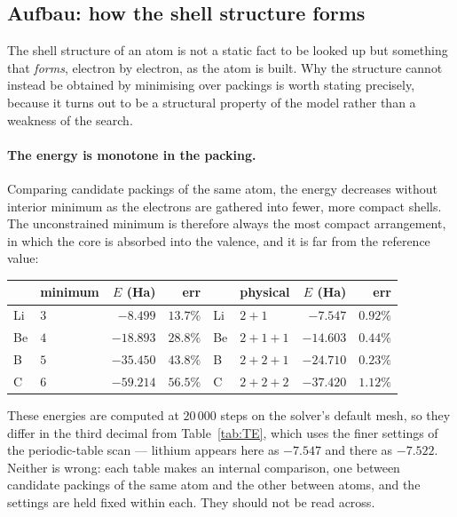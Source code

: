 \documentclass[11pt]{article}
\begin{document}
\subsection{Aufbau: how the shell structure forms}\label{sec:aufbau}

The shell structure of an atom is not a static fact to be looked up but something that
\emph{forms}, electron by electron, as the atom is built. Why the structure cannot instead be
obtained by minimising over packings is worth stating precisely, because it turns out to be a
structural property of the model rather than a weakness of the search.

\paragraph{The energy is monotone in the packing.} Comparing candidate packings of the
same atom, the energy decreases without interior minimum as the electrons are gathered
into fewer, more compact shells. The unconstrained minimum is therefore always the most
compact arrangement, in which the core is absorbed into the valence, and it is far from
the reference value:

\begin{center}\footnotesize
\begin{tabular}{llrr@{\qquad}llrr}
\toprule
 & minimum & $E$ (Ha) & err & & physical & $E$ (Ha) & err \\
\midrule
Li & $3$       & $-8.499$  & $13.7\%$ & Li & $2{+}1$       & $-7.547$  & $0.92\%$ \\
Be & $4$       & $-18.893$ & $28.8\%$ & Be & $2{+}1{+}1$   & $-14.603$ & $0.44\%$ \\
B  & $5$       & $-35.450$ & $43.8\%$ & B  & $2{+}2{+}1$   & $-24.710$ & $0.23\%$ \\
C  & $6$       & $-59.214$ & $56.5\%$ & C  & $2{+}2{+}2$   & $-37.420$ & $1.12\%$ \\
\bottomrule
\end{tabular}
\end{center}

\noindent These energies are computed at $20\,000$ steps on the solver's default mesh, so they differ
in the third decimal from Table~\ref{tab:TE}, which uses the finer settings of the periodic-table scan
--- lithium appears here as $-7.547$ and there as $-7.522$. Neither is wrong: each table makes an
internal comparison, one between candidate packings of the same atom and the other between atoms, and
the settings are held fixed within each. They should not be read across.
\end{document}
